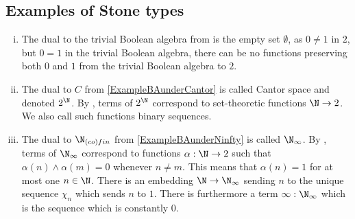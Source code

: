 \subsection{Examples of Stone types}
\begin{example}\label{ExampleBAunderEmpty}
  \begin{enumerate}[(i)]
  \item   The dual to the trivial Boolean algebra from  is the empty set 
    $\emptyset$, 
    as $0\neq 1$ in $2$, but $0=1$ in the trivial Boolean algebra, 
    there can be no functions preserving both $0$ and $1$ 
    from the trivial Boolean algebra to $2$. 
  \item   The dual to $C$ from  \ref{ExampleBAunderCantor} is called Cantor space 
    and denoted $2^\N$. 
    By , terms of $2^\N$ 
    correspond to set-theoretic functions $\N \to 2$. 
    We also call such functions binary sequences. 
  \item The dual to $\N_{(co)fin}$ from  \ref{ExampleBAunderNinfty} is called 
    $\N_\infty$. By , terms of $\N_\infty$ 
    correspond to functions $\alpha: \N \to 2$ such that $\alpha(n) \wedge \alpha(m) = 0$ 
    whenever $n \neq m$. This means that $\alpha(n) = 1$ for at most one $n\in\N$. 
    There is an embedding $\N \to \N_\infty$ sending $n$ to the unique sequence $\chi_n$
    which sends $n$ to $1$. 
    There is furthermore a term $\infty:\N_\infty$ which is the sequence which is constantly $0$. 
  \end{enumerate}
\end{example}

